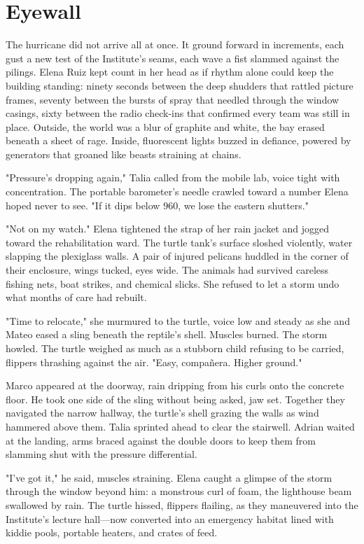 \chapter{Eyewall}

The hurricane did not arrive all at once. It ground forward in increments, each gust a new test of the Institute's seams, each wave a fist slammed against the pilings. Elena Ruiz kept count in her head as if rhythm alone could keep the building standing: ninety seconds between the deep shudders that rattled picture frames, seventy between the bursts of spray that needled through the window casings, sixty between the radio check-ins that confirmed every team was still in place. Outside, the world was a blur of graphite and white, the bay erased beneath a sheet of rage. Inside, fluorescent lights buzzed in defiance, powered by generators that groaned like beasts straining at chains.

"Pressure's dropping again," Talia called from the mobile lab, voice tight with concentration. The portable barometer's needle crawled toward a number Elena hoped never to see. "If it dips below 960, we lose the eastern shutters."

"Not on my watch." Elena tightened the strap of her rain jacket and jogged toward the rehabilitation ward. The turtle tank's surface sloshed violently, water slapping the plexiglass walls. A pair of injured pelicans huddled in the corner of their enclosure, wings tucked, eyes wide. The animals had survived careless fishing nets, boat strikes, and chemical slicks. She refused to let a storm undo what months of care had rebuilt.

"Time to relocate," she murmured to the turtle, voice low and steady as she and Mateo eased a sling beneath the reptile's shell. Muscles burned. The storm howled. The turtle weighed as much as a stubborn child refusing to be carried, flippers thrashing against the air. "Easy, compañera. Higher ground."

Marco appeared at the doorway, rain dripping from his curls onto the concrete floor. He took one side of the sling without being asked, jaw set. Together they navigated the narrow hallway, the turtle's shell grazing the walls as wind hammered above them. Talia sprinted ahead to clear the stairwell. Adrian waited at the landing, arms braced against the double doors to keep them from slamming shut with the pressure differential.

"I've got it," he said, muscles straining. Elena caught a glimpse of the storm through the window beyond him: a monstrous curl of foam, the lighthouse beam swallowed by rain. The turtle hissed, flippers flailing, as they maneuvered into the Institute's lecture hall—now converted into an emergency habitat lined with kiddie pools, portable heaters, and crates of feed.

